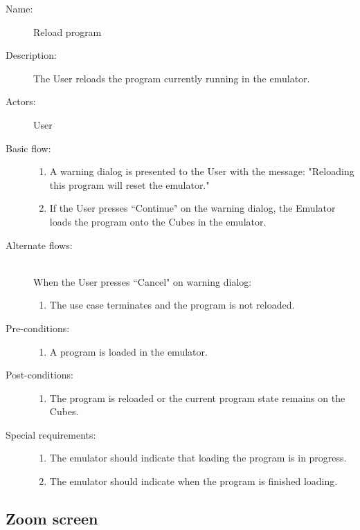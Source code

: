 \documentclass[12pt]{article}
\begin{document}
    \begin{description}
      \item[Name:] Reload program
      \item[Description:] The User reloads the program currently running in the emulator.
      \item[Actors:] User
      \item[Basic flow:] \hfill
        \begin{enumerate}
			\item{A warning dialog is presented to the User with the message: "Reloading this program will reset the emulator."}
			\item{If the User presses ``Continue" on the warning dialog, the Emulator loads the program onto the Cubes in the emulator.}
        \end{enumerate}
      \item[Alternate flows:] \hfill \\
	When the User presses ``Cancel" on warning dialog:
        \begin{enumerate}
          \item{The use case terminates and the program is not reloaded.}
        \end{enumerate}
      \item[Pre-conditions:] \hfill
        \begin{enumerate}
	  \item{A program is loaded in the emulator.}
        \end{enumerate}
      \item[Post-conditions:] \hfill
        \begin{enumerate}
	  \item{The program is reloaded or the current program state remains on the Cubes.}
        \end{enumerate}
      \item[Special requirements:] \hfill
        \begin{enumerate}
          \item{The emulator should indicate that loading the program is in progress.}
	  \item{The emulator should indicate when the program is finished loading.}
        \end{enumerate}
    \end{description}

  \subsection{Zoom screen}
\end{document}
